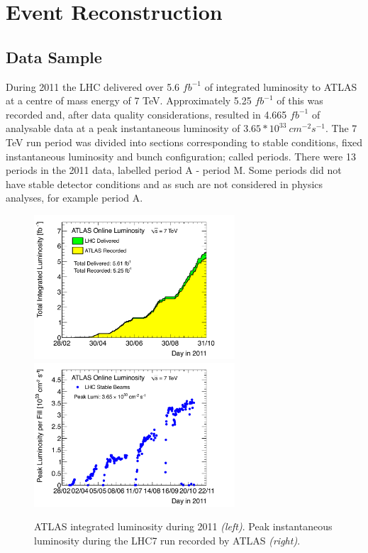 \chapter{Event Reconstruction}

\section{Data Sample}

During 2011 the LHC delivered over 5.6 $fb^{-1}$ of integrated luminosity to ATLAS at a centre of mass energy of 7 TeV. Approximately 5.25 $fb^{-1}$ of this was recorded and, after data quality considerations, resulted in 4.665 $fb^{-1}$ of analysable data at a peak instantaneous luminosity of $3.65 * 10^{33}~cm^{-2}s^{-1}$. The 7 TeV run period was divided into sections corresponding to stable conditions, fixed instantaneous luminosity and bunch configuration; called periods. There were 13 periods in the 2011 data, labelled period A - period M. Some periods did not have stable detector conditions and as such are not considered in physics analyses, for example period A.

\begin{figure}[htbp!]
\begin{center}
\includegraphics[width=75mm]{f/sumLumiByDay}
\includegraphics[width=75mm]{f/peakLumiByFill}
\end{center}
\caption{ATLAS integrated luminosity during 2011 \textit{(left)}. Peak instantaneous luminosity during the LHC7 run recorded by ATLAS \textit{(right)}.}
\label{fig:lumi}
\end{figure}

